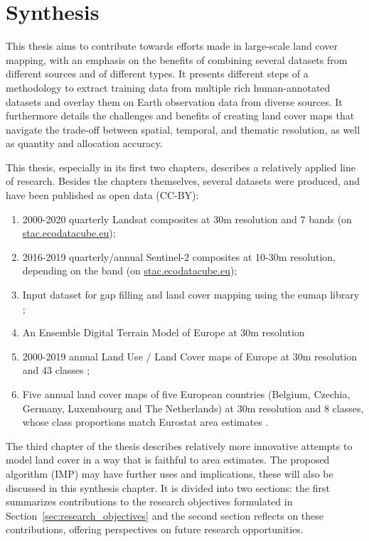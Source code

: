 \chapter[Synthesis]{Synthesis}
\label{cha:Chapter6}
\newpage

This thesis aims to contribute towards efforts made in large-scale land cover mapping, with an emphasis on the benefits of combining several datasets from different sources and of different types. It presents different steps of a methodology to extract training data from multiple rich human-annotated datasets and overlay them on Earth observation data from diverse sources. It furthermore details the challenges and benefits of creating land cover maps that navigate the trade-off between spatial, temporal, and thematic resolution, as well as quantity and allocation accuracy.

This thesis, especially in its first two chapters, describes a relatively applied line of research. Besides the chapters themselves, several datasets were produced, and have been published as open data (CC-BY):
\begin{enumerate}
    \item 2000-2020 quarterly Landsat composites at 30m resolution and 7 bands (on \url{stac.ecodatacube.eu});
    \item 2016-2019 quarterly/annual Sentinel-2 composites at 10-30m resolution, depending on the band (on \url{stac.ecodatacube.eu});
    \item Input dataset for gap filling and land cover mapping using the eumap library \citep{parente2020input};
    \item An Ensemble Digital Terrain Model of Europe at 30m resolution \citep{hengl2021continental}
    \item 2000-2019 annual Land Use / Land Cover maps of Europe at 30m resolution and 43 classes \citep{parente2021continental};
    \item Five annual land cover maps of five European countries (Belgium, Czechia, Germany, Luxembourg and The Netherlands) at 30m resolution and 8 classes, whose class proportions match Eurostat area estimates \citep{witjes2024iterative_data}.
\end{enumerate}
The third chapter of the thesis describes relatively more innovative attempts to model land cover in a way that is faithful to area estimates. The proposed algorithm (IMP) may have further uses and implications, these will also be discussed in this synthesis chapter. It is divided into two sections: the first summarizes contributions to the research objectives formulated in Section~\ref{sec:research_objectives} and the second section reflects on these contributions, offering perspectives on future research opportunities. 

